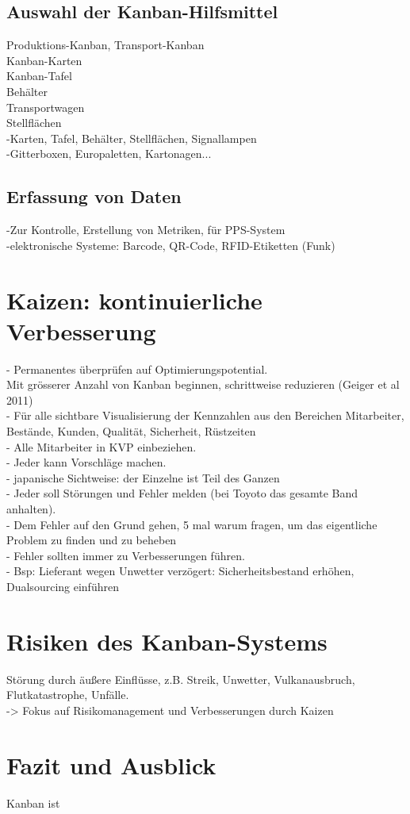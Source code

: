 \subsection{Auswahl der Kanban-Hilfsmittel}
Produktions-Kanban, Transport-Kanban\\
Kanban-Karten\\
Kanban-Tafel\\
Behälter\\
Transportwagen\\
Stellflächen\\
-Karten, Tafel, Behälter, Stellflächen, Signallampen\\
-Gitterboxen, Europaletten, Kartonagen...\\

\subsection{Erfassung von Daten}
-Zur Kontrolle, Erstellung von Metriken, für PPS-System\\
-elektronische Systeme: Barcode, QR-Code, RFID-Etiketten (Funk)\\

\section{Kaizen: kontinuierliche Verbesserung}
- Permanentes überprüfen auf Optimierungspotential.\\
Mit grösserer Anzahl von Kanban beginnen, schrittweise reduzieren (Geiger et al 2011)\\
- Für alle sichtbare Visualisierung der Kennzahlen aus den Bereichen Mitarbeiter, Bestände, Kunden, Qualität, Sicherheit, Rüstzeiten\\
- Alle Mitarbeiter in KVP einbeziehen.\\
- Jeder kann Vorschläge machen.\\
- japanische Sichtweise: der Einzelne ist Teil des Ganzen\\
- Jeder soll Störungen und Fehler melden (bei Toyoto das gesamte Band anhalten).\\
- Dem Fehler auf den Grund gehen, 5 mal warum fragen, um das eigentliche Problem zu finden und zu beheben\\
- Fehler sollten immer zu Verbesserungen führen.\\
- Bsp: Lieferant wegen Unwetter verzögert: Sicherheitsbestand erhöhen, Dualsourcing einführen\\

\section{Risiken des Kanban-Systems}
Störung durch äußere Einflüsse, z.B. Streik, Unwetter, Vulkanausbruch, Flutkatastrophe, Unfälle.\\
-> Fokus auf Risikomanagement und Verbesserungen durch Kaizen\\

\section{Fazit und Ausblick}
Kanban ist 
